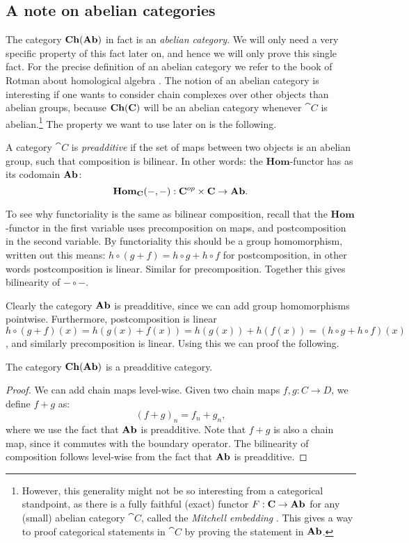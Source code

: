 \subsection{A note on abelian categories}
The category $\mathbf{Ch}(\mathbf{Ab})$ in fact is an \emph{abelian category}. We will only need a very specific property of this fact later on, and hence we will only prove this single fact. For the precise definition of an abelian category we refer to the book of Rotman about homological algebra \cite[Chapter~5.5]{rotman}. The notion of an abelian category is interesting if one wants to consider chain complexes over other objects than abelian groups, because $\mathbf{Ch}(\mathbf{C})$ will be an abelian category whenever $\cat{C}$ is abelian.\footnote{However, this generality might not be so interesting from a categorical standpoint, as there is a fully faithful (exact) functor $F: \mathbf{C} \to \mathbf{Ab}$ for any (small) abelian category $\cat{C}$, called the \emph{Mitchell embedding} \cite{rotman}. This gives a way to proof categorical statements in $\cat{C}$ by proving the statement in $\mathbf{Ab}$.} The property we want to use later on is the following.
\begin{definition}
	A category $\cat{C}$ is \emph{preadditive} if the set of maps between two objects is an abelian group, such that composition is bilinear. In other words: the $\mathbf{Hom}$-functor has as its codomain $\mathbf{Ab}$:
	$$ \mathbf{Hom}_{\mathbf{C}}(-, -) : \mathbf{C}^{op} \times \mathbf{C} \to \mathbf{Ab}. $$
\end{definition}
To see why functoriality is the same as bilinear composition, recall that the $\mathbf{Hom}$-functor in the first variable uses precomposition on maps, and postcomposition in the second variable. By functoriality this should be a group homomorphism, written out this means: $h \circ (g + f) = h \circ g + h \circ f$ for postcomposition, in other words postcomposition is linear. Similar for precomposition. Together this gives bilinearity of $- \circ -$.

Clearly the category $\mathbf{Ab}$ is preadditive, since we can add group homomorphisms pointwise. Furthermore, postcomposition is linear $h \circ (g + f) (x) = h(g(x)+f(x)) = h(g(x)) + h(f(x)) = (h \circ g + h \circ f) (x)$, and similarly precomposition is linear. Using this we can proof the following.
\begin{lemma}
	The category $\mathbf{Ch}(\mathbf{Ab})$ is a preadditive category.
\end{lemma}
\begin{proof}
	We can add chain maps level-wise. Given two chain maps $f, g: C \to D$, we define $f+g$ as:
	$$ (f+g)_n = f_n + g_n, $$
	where we use the fact that $\mathbf{Ab}$ is preadditive. Note that $f+g$ is also a chain map, since it commutes with the boundary operator. The bilinearity of composition follows level-wise from the fact that $\mathbf{Ab}$ is preadditive.
\end{proof}

